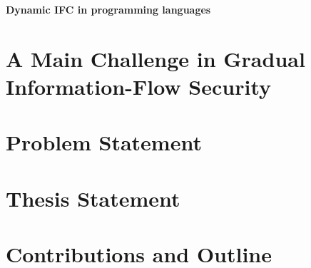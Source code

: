 \textbf{Dynamic IFC in programming languages}

\textbf{}

\section{A Main Challenge in Gradual Information-Flow Security}

\section{Problem Statement}

\section{Thesis Statement}

\section{Contributions and Outline}

